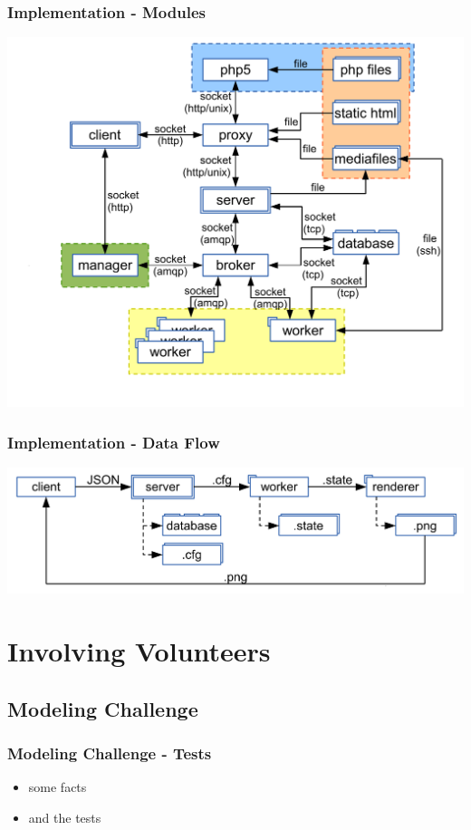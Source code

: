 \documentclass[aspectratio=1610]{beamer}
\begin{document}
\begin{frame}
  \frametitle{Implementation - Modules}
  \includegraphics[height=\textheight]{imgs/whole_setup}
\end{frame}

\begin{frame}
  \frametitle{Implementation - Data Flow}
  \includegraphics[width=\textwidth]{imgs/dataflow}
\end{frame}


\section{Involving Volunteers}
\subsection{Modeling Challenge}

\begin{frame}
  \frametitle{Modeling Challenge - Tests}
  \begin{itemize}
    \item some facts
    \item and the tests
  \end{itemize}
\end{frame}
\end{document}
